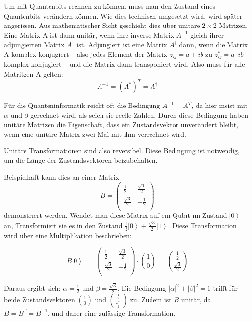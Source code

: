 Um mit Quantenbits rechnen zu können, muss man den Zustand eines Quantenbits verändern können. Wie dies technisch umgesetzt wird, wird später angerissen. Aus mathematischer Sicht geschieht dies über unitäre $2\times2$ Matrizen. \\

Eine Matrix A ist dann unitär, wenn ihre inverse Matrix $A^{-1}$ gleich ihrer adjungierten Matrix $A^\dag$ ist. Adjungiert ist eine Matrix $A^\dag$ dann, wenn die Matrix A komplex konjugiert – also jedes Element der Matrix $z_{ij}=a+ib$ zu $z_{ij}^\ast=a–ib$ komplex konjugiert – und die Matrix dann transponiert wird. Also muss für alle Matritzen A gelten:
$$A^{-1}=(A^*)^T=A^\dag$$

Für die Quanteninformatik reicht oft die Bedingung $A^{-1}=A^T$, da hier meist mit $\alpha$ und $\beta$ gerechnet wird, als seien sie reelle Zahlen. Durch diese Bedingung haben unitäre Matrizen die Eigenschaft, dass ein Zustandsvektor unverändert bleibt, wenn eine unitäre Matrix zwei Mal mit ihm verrechnet wird. 

Unitäre Transformationen sind also reversibel. Diese Bedingung ist notwendig, um die Länge der Zustandsvektoren beizubehalten.

Beispielhaft kann dies an einer Matrix $$B=\left(\begin{matrix}\frac{1}{2}&\frac{\sqrt3}{2}\\\frac{\sqrt3}{2}&-\frac{1}{2}\\\end{matrix}\right)$$ demonstriert werden. Wendet man diese Matrix auf ein Qubit im Zustand $\left|0\right\rangle$ an, Transformiert sie es in den Zustand $\frac{1}{2}\left|0\right\rangle+\frac{\sqrt3}{2}\left|1\right\rangle$. Diese Transformation wird über eine Multiplikation beschrieben:

$$B\left|\left.0\right\rangle\ =\ \right.\left(\begin{matrix}\frac{1}{2}&\frac{\sqrt3}{2}\\\frac{\sqrt3}{2}&-\frac{1}{2}\\\end{matrix}\right)\cdot\binom{1}{0}=\ \binom{\frac{1}{2}}{\frac{\sqrt3}{2}}$$

Daraus ergibt sich: $\alpha=\frac{1}{2}$ und $\beta=\frac{\sqrt3}{2}$. Die Bedingung $\left|\alpha\right|^2+\left|\beta\right|^2=1$ trifft für beide Zustandsvektoren $\binom{1}{0}$ und $\binom{\frac{1}{2}}{\frac{\sqrt3}{2}}$ zu. Zudem ist $B$ unitär, da $B=B^T= B^{-1}$, und daher eine zulässige Transformation.

